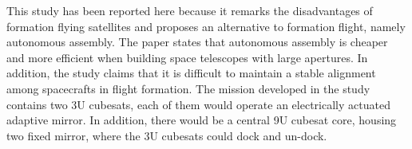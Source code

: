 This study has been reported here because it remarks the disadvantages
of formation flying satellites and proposes an alternative to formation
flight, namely autonomous assembly. The paper states that autonomous assembly
is cheaper and more efficient when building space telescopes with
large apertures. In addition, the study claims that it is difficult
to maintain a stable alignment among spacecrafts in flight formation.
The mission developed in the study contains two 3U cubesats, each
of them would operate an electrically actuated adaptive mirror. In
addition, there would be a central 9U cubesat core, housing two fixed
mirror, where the 3U cubesats could dock and un-dock.\cite{Underwood_ReconfigTelescope}